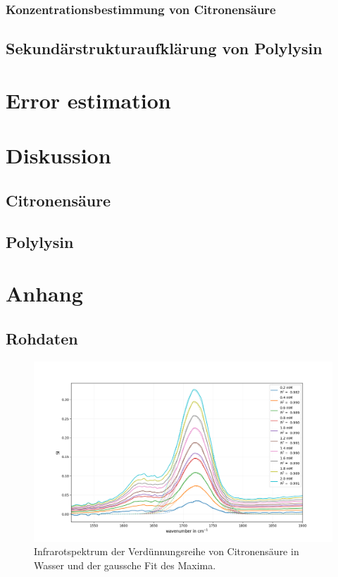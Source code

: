 \documentclass[10pt,a4paper]{article}
\begin{document}
	\subsubsection{Konzentrationsbestimmung von Citronensäure}
	\subsection{Sekundärstrukturaufklärung von Polylysin}
	
	\section{Error estimation}
	
	
	
	\section{Diskussion}
	\subsection{Citronensäure}
	\subsection{Polylysin}
	
	\section{Anhang}
	\subsection{Rohdaten}
		
		\begin{figure}[H]
			\centering
			\includegraphics[scale=0.55]{Standardcurve_citricacid_fit.png}
			\caption{Infrarotspektrum der Verdünnungsreihe von Citronensäure in Wasser und der gaussche Fit des Maxima.}
			\label{fig:IR_Standardcurve}
		\end{figure}
	
\end{document}
